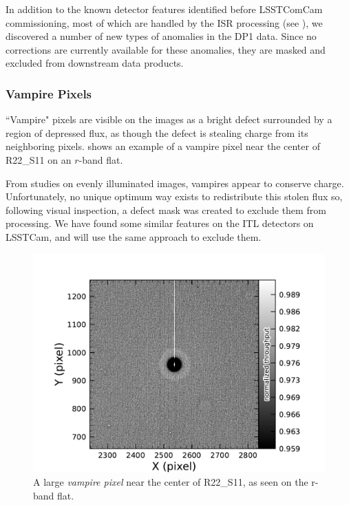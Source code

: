 In addition to the known detector features identified before LSSTComCam commissioning, most of which are handled by the ISR processing (see ), we discovered a number of new types of anomalies in the DP1 data. 
Since no corrections are currently available for these anomalies, they are masked and excluded from downstream data products.

\subsubsection{Vampire Pixels}
``Vampire" pixels are visible on the images as a bright defect surrounded by a region of depressed flux, as though the defect is stealing charge from its neighboring pixels.
 shows an example of a vampire pixel near the center of R22\_S11 on an $r$-band flat.

From studies on evenly illuminated images, vampires appear to conserve charge.
Unfortunately, no unique optimum way exists to redistribute this stolen flux so, following visual inspection, a defect mask was created to exclude them from processing.
We have found some similar features on the ITL detectors on LSSTCam, and will use the same approach to exclude them.
\begin{figure}[htb!]
  \centering
  \includegraphics[width=0.98\linewidth]{dp1_isr_anomalies-vampire_pixel}
  \caption{A large \textit{vampire pixel} near the center of R22\_S11, as seen on the r-band flat.}
   \label{fig:anomalies_vampire_pixels}
\end{figure}


